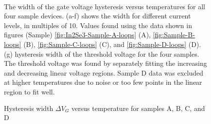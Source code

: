 \begin{figure}
\begin{centering}
{\begin{centering}
\par\end{centering}
}~~~~
\par\end{centering}
\begin{centering}
\par\end{centering}
\caption{Hysteresis width $\Delta V_{G}$ versus temperature for samples A,
B, C, and D\label{fig:dVG-vs-T}}

The width of the gate voltage hysteresis versus temperatures for all
four sample devices. (a-f) shows the width for different current levels,
in multiples of 10. Values found using the data shown in figures (Sample)
\ref{fig:In2Se3-Sample-A-loops} (A), \ref{fig:Sample-B-loops} (B),
\ref{fig:Sample-C-loops} (C), and \ref{fig:Sample-D-loops} (D).
(g) hysteresis width of the threshold voltage for the four samples.
The threshold voltage was found by separately fitting the increasing
and decreasing linear voltage regions\citep{2013revisiting}. Sample
D data was excluded at higher temperatures due to noise or too few
points in the linear region to fit well.
\end{figure}

